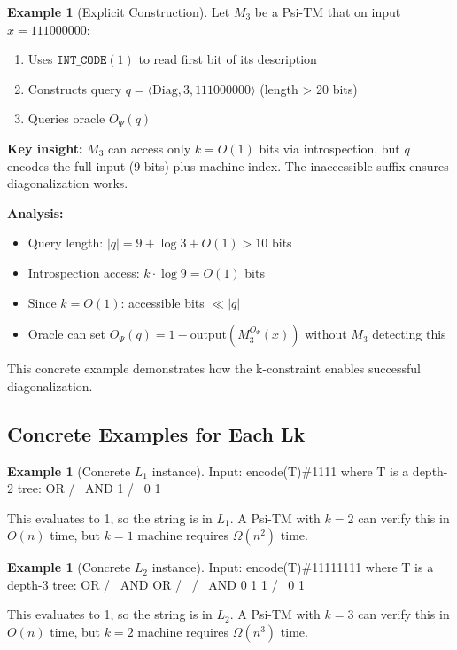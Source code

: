 \documentclass[11pt]{article}
\theoremstyle{definition}
\newtheorem{example}[theorem]{Example}
\begin{document}
\begin{example}[Explicit Construction]
\label{ex:concrete-diagonalization}
Let $M_3$ be a Psi-TM that on input $x = 111000000$:
\begin{enumerate}
\item Uses $\texttt{INT\_CODE}(1)$ to read first bit of its description
\item Constructs query $q = \langle \text{Diag}, 3, 111000000 \rangle$ (length > 20 bits)
\item Queries oracle $O_\Psi(q)$
\end{enumerate}

\textbf{Key insight:} $M_3$ can access only $k=O(1)$ bits via introspection, but $q$ encodes the full input (9 bits) plus machine index. The inaccessible suffix ensures diagonalization works.

\textbf{Analysis:}
\begin{itemize}
\item Query length: $|q| = 9 + \log 3 + O(1) > 10$ bits
\item Introspection access: $k \cdot \log 9 = O(1)$ bits
\item Since $k = O(1)$: accessible bits $\ll |q|$
\item Oracle can set $O_\Psi(q) = 1 - \text{output}(M_3^{O_\Psi}(x))$ without $M_3$ detecting this
\end{itemize}

This concrete example demonstrates how the k-constraint enables successful diagonalization.
\end{example}

\subsection{Concrete Examples for Each Lk}

\begin{example}[Concrete $L_1$ instance]
Input: encode(T)\#1111 where T is a depth-2 tree:
       OR
      /  \
    AND   1
    / \
   0   1
   
This evaluates to 1, so the string is in $L_1$.
A Psi-TM with $k=2$ can verify this in $O(n)$ time,
but $k=1$ machine requires $\Omega(n^2)$ time.
\end{example}

\begin{example}[Concrete $L_2$ instance]
Input: encode(T)\#11111111 where T is a depth-3 tree:
        OR
       /  \
      AND  OR
     /  \  / \
    AND  0 1  1
   /  \
  0    1

This evaluates to 1, so the string is in $L_2$.
A Psi-TM with $k=3$ can verify this in $O(n)$ time,
but $k=2$ machine requires $\Omega(n^3)$ time.
\end{example}
\end{document}
